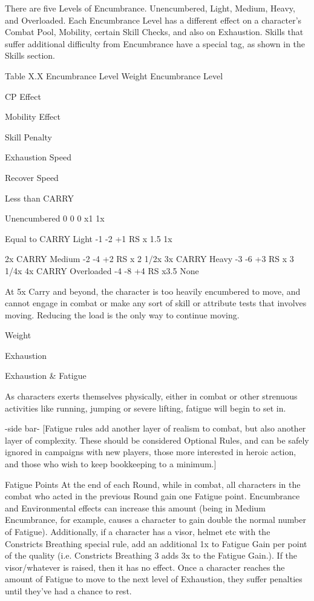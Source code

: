 \documentclass[oneside,11pt,english]{book}
\begin{document}
 

There are five Levels of Encumbrance. Unencumbered, Light, Medium, Heavy, and Overloaded. 
Each Encumbrance Level has a different effect on a character’s Combat Pool, Mobility, certain Skill 
Checks, and also on Exhaustion. 
Skills that suffer additional difficulty from Encumbrance have a special tag, as shown in the Skills 
section. 

 

Table X.X Encumbrance Level 
Weight Encumbrance 
Level 

CP 
Effect 

Mobility 
Effect 

Skill 
Penalty 

Exhaustion 
Speed 

Recover 
Speed 

Less than 
CARRY 

Unencumbered 0 0 0 x1 1x 

Equal to CARRY Light -1 -2 +1 RS x 1.5 1x 


2x CARRY Medium -2 -4 +2 RS x 2 1/2x 
3x CARRY Heavy -3 -6 +3 RS x 3 1/4x 
4x CARRY Overloaded -4 -8 +4 RS x3.5 None 

 
At 5x Carry and beyond, the character is too heavily encumbered to move, and cannot engage in combat 
or make any sort of skill or attribute tests that involves moving. Reducing the load is the only way to 
continue moving. 

 

 

Weight 

 

Exhaustion 

 
Exhaustion \& Fatigue 

 

As characters exerts themselves physically, either in combat or other strenuous activities like running, 
jumping or severe lifting, fatigue will begin to set in. 

 

-side bar- 
[Fatigue rules add another layer of realism to combat, but also another layer of complexity. These 
should be considered Optional Rules, and can be safely ignored in campaigns with new players, 
those more interested in heroic action, and those who wish to keep bookkeeping to a minimum.] 

 

Fatigue Points 
At the end of each Round, while in combat, all characters in the combat who acted in the previous Round 
gain one Fatigue point. Encumbrance and Environmental effects can increase this amount (being in 
Medium Encumbrance, for example, causes a character to gain double the normal number of Fatigue). 
Additionally, if a character has a visor, helmet etc with the Constricts Breathing special rule, add an 
additional 1x to Fatigue Gain per point of the quality (i.e. Constricts Breathing 3 adds 3x to the Fatigue 
Gain.). If the visor/whatever is raised, then it has no effect. Once a character reaches the amount of 
Fatigue to move to the next level of Exhaustion, they suffer penalties until they’ve had a chance to rest. 
\end{document}

